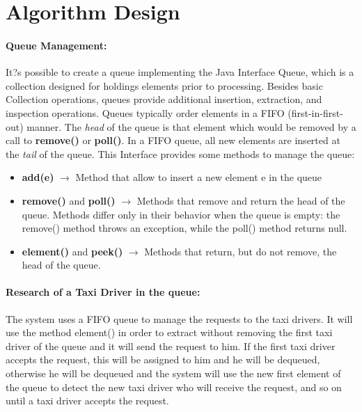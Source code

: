 \chapter{Algorithm Design} \label{chap3}
\subsubsection{Queue Management:}
It?s possible to create a queue implementing the Java Interface Queue, which is a collection designed for holdings elements prior to processing. Besides basic Collection operations, queues provide additional insertion, extraction, and inspection operations. Queues typically order elements in a FIFO (first-in-first-out) manner. The \textit{head} of the queue is that element which would be removed by a call to \textbf{remove()} or \textbf{poll()}. In a FIFO queue, all new elements are inserted at the \textit{tail} of the queue.
This Interface provides some methods to manage the queue:
\begin{itemize}
	\item \textbf{add(e)} $\rightarrow$ Method that allow to insert a new element e in the queue
	\item \textbf{remove()} and \textbf{poll()} $\rightarrow$ Methods that remove and return the head of the queue. Methods differ only in their behavior when the queue is empty: the remove() method throws an exception, while the poll() method returns null.
	\item \textbf{element()} and \textbf{peek()} $\rightarrow$ Methods that return, but do not remove, the head of the queue.
\end{itemize}

\subsubsection{Research of a Taxi Driver in the queue:}
The system uses a FIFO queue to manage the requests to the taxi drivers. It will use the method element() in order to extract without removing the first taxi driver of the queue and it will send the request to him. If the first taxi driver accepts the request, this will be assigned to him and he will be dequeued, otherwise he will be dequeued and the system will use the new first element of the queue to detect the new taxi driver who will receive the request, and so on until a taxi driver accepts the request.

